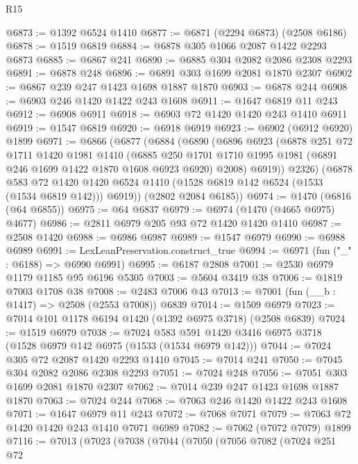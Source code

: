 \begin{lexlean}{R15}
\begin{coremodule}
@6873 := @1392 @6524 @1410
@6877 := @6871 (@2294 @6873) (@2508 @6186)
@6878 := @1519 @6819
@6884 := @6878 @305 @1066 @2087 @1422 @2293 @6873
@6885 := @6867 @241
@6890 := @6885 @304 @2082 @2086 @2308 @2293
@6891 := @6878 @248
@6896 := @6891 @303 @1699 @2081 @1870 @2307
@6902 := @6867 @239 @247 @1423 @1698 @1887 @1870
@6903 := @6878 @244
@6908 := @6903 @246 @1420 @1422 @243 @1608
@6911 := @1647 @6819 @11 @243
@6912 := @6908 @6911
@6918 := @6903 @72 @1420 @1420 @243 @1410 @6911
@6919 := @1547 @6819
@6920 := @6918 @6919
@6923 := @6902 (@6912 @6920) @1899
@6971 := @6866
    (@6877
      (@6884
        (@6890
          (@6896
            @6923
            (@6878
              @251
              @72
              @1711
              @1420
              @1981
              @1410
              (@6885
                @250
                @1701
                @1710
                @1995
                @1981
                (@6891 @246 @1699 @1422 @1870 @1608 @6923 @6920)
                @2008)
              @6919))
          @2326)
        (@6878
          @583
          @72
          @1420
          @1420
          @6524
          @1410
          (@1528 @6819 @142 @6524 (@1533 (@1534 @6819 @142)))
          @6919))
      (@2802 @2084 @6185))
@6974 := @1470 (@6816 (@64 @6855))
@6975 := @64 @6837
@6979 := @6974 (@1470 (@4665 @6975) @4677)
@6986 := @2811 @6979 @205 @93 @72 @1420 @1420 @1410
@6987 := @2508 @1420
@6988 := @6986 @6987
@6989 := @1547 @6979
@6990 := @6988 @6989
@6991 := LexLeanPreservation.construct_true
@6994 := @6971 (fun ("_" : @6188) => @6990 @6991)
@6995 := @6187 @2808
@7001 := @2530 @6979 @1179 @1185 @95 @6196 @5305
@7003 := @5604 @3419 @38
@7006 := @1819 @7003 @1708 @38
@7008 := @2483 @7006 @43
@7013 := @7001 (fun (__b : @1417) => @2508 (@2553 @7008)) @6839
@7014 := @1509 @6979
@7023 := @7014 @101 @1178 @6194 @1420 (@1392 @6975 @3718) (@2508 @6839)
@7024 := @1519 @6979
@7038 := @7024 @583 @591 @1420 @3416 @6975 @3718 (@1528 @6979 @142 @6975 (@1533 (@1534 @6979 @142)))
@7044 := @7024 @305 @72 @2087 @1420 @2293 @1410
@7045 := @7014 @241
@7050 := @7045 @304 @2082 @2086 @2308 @2293
@7051 := @7024 @248
@7056 := @7051 @303 @1699 @2081 @1870 @2307
@7062 := @7014 @239 @247 @1423 @1698 @1887 @1870
@7063 := @7024 @244
@7068 := @7063 @246 @1420 @1422 @243 @1608
@7071 := @1647 @6979 @11 @243
@7072 := @7068 @7071
@7079 := @7063 @72 @1420 @1420 @243 @1410 @7071 @6989
@7082 := @7062 (@7072 @7079) @1899
@7116 := @7013
    (@7023
      (@7038
        (@7044
          (@7050
            (@7056
              @7082
              (@7024
                @251
                @72

\end{coremodule}
\end{lexlean}
